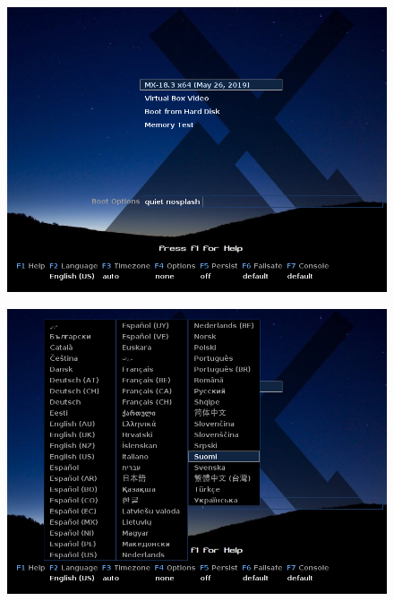 \documentclass[a4paper, 12pt, finnish]{article}
\begin{document}
\begin{figure}[htbp]
     \centering
      \begin{minipage}{.5\textwidth}
           \centering
            \includegraphics[width=.98\linewidth]{asen/boot}
              \label{fig:boot}
               \end{minipage}%
               \begin{minipage}{.5\textwidth}
                    \centering
                     \includegraphics[width=.98\linewidth]{asen/lang}
                       \label{fig:lang}
                        \end{minipage}
                         \end{figure}
\end{document}
